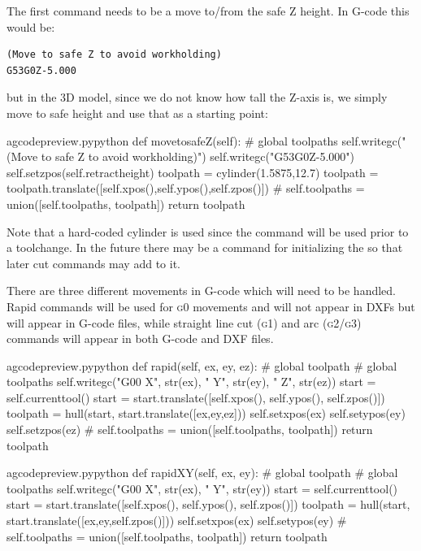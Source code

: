 \documentclass{ltxdoc}
\begin{document}
The first command needs to be a move to/from the safe Z height. In G-code this would be:

\begin{verbatim}
(Move to safe Z to avoid workholding)
G53G0Z-5.000
\end{verbatim}

\noindent but in the 3D model, since we do not know how tall the Z-axis is, we simply move to safe height and use that as a starting point:

\lstset{firstnumber=\thegcpy}
\begin{writecode}{a}{gcodepreview.py}{python}
    def movetosafeZ(self):
#        global toolpaths
        self.writegc("(Move to safe Z to avoid workholding)")
        self.writegc("G53G0Z-5.000")
        self.setzpos(self.retractheight)
        toolpath = cylinder(1.5875,12.7)
        toolpath = toolpath.translate([self.xpos(),self.ypos(),self.zpos()])
#        self.toolpaths = union([self.toolpaths, toolpath])
        return toolpath
        
\end{writecode}
\addtocounter{gcpy}{10}

Note that a hard-coded cylinder is used since the command will be used prior to a toolchange. In the future there may be a command for initializing the  so that later cut commands may add to it.

There are three different movements in G-code which will need to be handled. Rapid commands will be used for \textsc{g0} movements and will not appear in DXFs but will appear in G-code files, while straight line cut (\textsc{g1}) and arc (\textsc{g2/g3}) commands will appear in both G-code and DXF files. 

\lstset{firstnumber=\thegcpy}
\begin{writecode}{a}{gcodepreview.py}{python}
    def rapid(self, ex, ey, ez):
#        global toolpath
#        global toolpaths
        self.writegc("G00 X", str(ex), " Y", str(ey), " Z", str(ez))
        start = self.currenttool()
        start = start.translate([self.xpos(), self.ypos(), self.zpos()])
        toolpath = hull(start, start.translate([ex,ey,ez]))
        self.setxpos(ex)
        self.setypos(ey)
        self.setzpos(ez)
#        self.toolpaths = union([self.toolpaths, toolpath])
        return toolpath
        
\end{writecode}
\addtocounter{gcpy}{13}

\lstset{firstnumber=\thegcpy}
\begin{writecode}{a}{gcodepreview.py}{python}
    def rapidXY(self, ex, ey):
#        global toolpath
#        global toolpaths
        self.writegc("G00 X", str(ex), " Y", str(ey))
        start = self.currenttool()
        start = start.translate([self.xpos(), self.ypos(), self.zpos()])
        toolpath = hull(start, start.translate([ex,ey,self.zpos()]))
        self.setxpos(ex)
        self.setypos(ey)
#        self.toolpaths = union([self.toolpaths, toolpath])
        return toolpath
        
\end{writecode}
\addtocounter{gcpy}{12}
\end{document}
